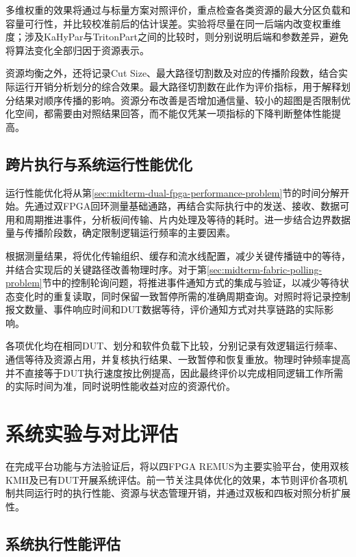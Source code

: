 多维权重的效果将通过与标量方案对照评价，重点检查各类资源的最大分区负载和容量可行性，并比较校准前后的估计误差。实验将尽量在同一后端内改变权重维度；涉及KaHyPar与TritonPart之间的比较时，则分别说明后端和参数差异，避免将算法变化全部归因于资源表示。

资源均衡之外，还将记录Cut Size、最大路径切割数及对应的传播阶段数，结合实际运行开销分析划分的综合效果。最大路径切割数在此作为评价指标，用于解释划分结果对顺序传播的影响。资源分布改善是否增加通信量、较小的超图是否限制优化空间，都需要由对照结果回答，而不能仅凭某一项指标的下降判断整体性能提高。

\subsection{跨片执行与系统运行性能优化}

运行性能优化将从第\ref{sec:midterm-dual-fpga-performance-problem}节的时间分解开始。先通过双FPGA回环测量基础通路，再结合实际执行中的发送、接收、数据可用和周期推进事件，分析板间传输、片内处理及等待的耗时。进一步结合边界数据量与传播阶段数，确定限制逻辑运行频率的主要因素。

根据测量结果，将优化传输组织、缓存和流水线配置，减少关键传播链中的等待，并结合实现后的关键路径改善物理时序。对于第\ref{sec:midterm-fabric-polling-problem}节中的控制轮询问题，将推进事件通知方式的集成与验证，以减少等待状态变化时的重复读取，同时保留一致暂停所需的准确周期查询。对照时将记录控制报文数量、事件响应时间和DUT数据等待，评价通知方式对共享链路的实际影响。

各项优化均在相同DUT、划分和软件负载下比较，分别记录有效逻辑运行频率、通信等待及资源占用，并复核执行结果、一致暂停和恢复重放。物理时钟频率提高并不直接等于DUT执行速度按比例提高，因此最终评价以完成相同逻辑工作所需的实际时间为准，同时说明性能收益对应的资源代价。

\section{系统实验与对比评估}
\label{sec:midterm-plan-system-evaluation}

在完成平台功能与方法验证后，将以四FPGA REMUS为主要实验平台，使用双核KMH及已有DUT开展系统评估。前一节关注具体优化的效果，本节则评价各项机制共同运行时的执行性能、资源与状态管理开销，并通过双板和四板对照分析扩展性。

\subsection{系统执行性能评估}

